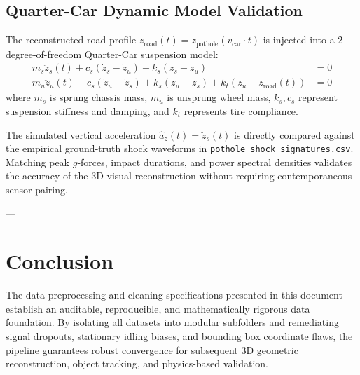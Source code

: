 \documentclass[11pt,a4paper]{article}
\begin{document}
\subsection{Quarter-Car Dynamic Model Validation}
The reconstructed road profile $z_{\text{road}}(t) = z_{\text{pothole}}(v_{\text{car}} \cdot t)$ is injected into a 2-degree-of-freedom Quarter-Car suspension model:
\begin{align}
m_s \ddot{z}_s(t) + c_s (\dot{z}_s - \dot{z}_u) + k_s (z_s - z_u) & = 0 \\
m_u \ddot{z}_u(t) + c_s (\dot{z}_u - \dot{z}_s) + k_s (z_u - z_s) + k_t (z_u - z_{\text{road}}(t)) & = 0
\end{align}
where $m_s$ is sprung chassis mass, $m_u$ is unsprung wheel mass, $k_s, c_s$ represent suspension stiffness and damping, and $k_t$ represents tire compliance. 

The simulated vertical acceleration $\hat{a}_z(t) = \ddot{z}_s(t)$ is directly compared against the empirical ground-truth shock waveforms in \texttt{pothole\_shock\_signatures.csv}. Matching peak $g$-forces, impact durations, and power spectral densities validates the accuracy of the 3D visual reconstruction without requiring contemporaneous sensor pairing.

---

\section{Conclusion}
The data preprocessing and cleaning specifications presented in this document establish an auditable, reproducible, and mathematically rigorous data foundation. By isolating all datasets into modular subfolders and remediating signal dropouts, stationary idling biases, and bounding box coordinate flaws, the pipeline guarantees robust convergence for subsequent 3D geometric reconstruction, object tracking, and physics-based validation.
\end{document}
